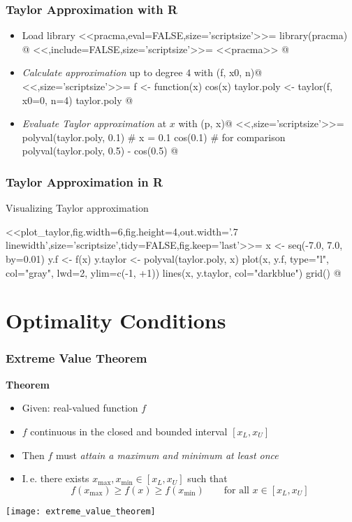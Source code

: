 \documentclass[%
  final,
  11pt, 
  show notes, %
  t, %
  fleqn, %
]{beamer}
\begin{document}
\begin{frame}[fragile]
  \frametitle{Taylor Approximation with R}
\begin{itemize}
\item Load library \verb@pracma@
<<pracma,eval=FALSE,size='scriptsize'>>=
library(pracma)
@
<<,include=FALSE,size='scriptsize'>>=
<<pracma>>
@
\item \emph{Calculate approximation} up to degree $4$ with \verb@taylor(f, x0, n)@
<<,size='scriptsize'>>=
f <- function(x) cos(x)
taylor.poly <- taylor(f, x0=0, n=4)
taylor.poly
@
\item \emph{Evaluate Taylor approximation} \verb@p@ at $x$ with \verb@polyval(p, x)@
<<,size='scriptsize'>>=
polyval(taylor.poly, 0.1) # x = 0.1
cos(0.1) # for comparison
polyval(taylor.poly, 0.5) - cos(0.5)
@
\end{itemize}
\end{frame}

\begin{frame}[fragile]
  \frametitle{Taylor Approximation in R}
Visualizing Taylor approximation

<<plot_taylor,fig.width=6,fig.height=4,out.width='.7\\linewidth',size='scriptsize',tidy=FALSE,fig.keep='last'>>=
x <- seq(-7.0, 7.0, by=0.01)
y.f <- f(x)
y.taylor <- polyval(taylor.poly, x)
plot(x, y.f, type="l", col="gray", lwd=2, ylim=c(-1, +1))
lines(x, y.taylor, col="darkblue")
grid()
@
\end{frame}

\section{Optimality Conditions}

\begin{frame}
  \frametitle{Extreme Value Theorem}
\textbf{Theorem}
\begin{itemize}
\item Given: real-valued function $f$
\item $f$ continuous in the closed and bounded interval $[x_{L}, x_{U}]$
\item Then $f$ must \emph{attain a maximum and minimum at least once}
\item I.\,e. there exists $x_{\max}, x_{\min} \in [x_{L}, x_{U}]$ such that
\begin{equation*}
f(x_{\max}) \geq f(x) \geq f(x_{\min}) \qquad\text{for all } x \in [x_{L}, x_{U}]
\end{equation*}
\end{itemize}

\hspace*{1cm}\texttt{[image: extreme\_value\_theorem]}
\end{frame}
\end{document}
